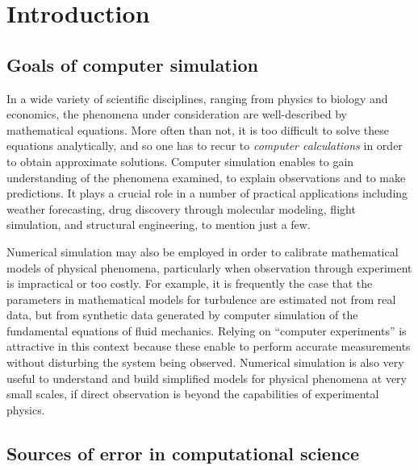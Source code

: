 \chapter*{Introduction}%

\section*{Goals of computer simulation}%
\label{sec:goals_of_computer_simulation}

In a wide variety of scientific disciplines,
ranging from physics to biology and economics,
the phenomena under consideration are well-described by mathematical equations.
More often than not,
it is too difficult to solve these equations analytically,
and so one has to recur to \emph{computer calculations} in order to obtain approximate solutions.
Computer simulation enables to gain understanding of the phenomena examined,
to explain observations and to make predictions.
It plays a crucial role in a number of practical applications including
weather forecasting, drug discovery through molecular modeling,
flight simulation, and structural engineering, to mention just a few.


Numerical simulation may also be employed in order to calibrate mathematical models of physical phenomena,
particularly when observation through experiment is impractical or too costly.
For example, it is frequently the case that the parameters in mathematical models for turbulence are estimated not from real data,
but from synthetic data generated by computer simulation of the fundamental equations of fluid mechanics.
Relying on ``computer experiments'' is attractive in this context because
these enable to perform accurate measurements without disturbing the system being observed.
Numerical simulation is also very useful to understand and build simplified models for physical phenomena at very small scales,
if direct observation is beyond the capabilities of experimental physics.

\section*{Sources of error in computational science}%
\label{sec:sources_of_error}


